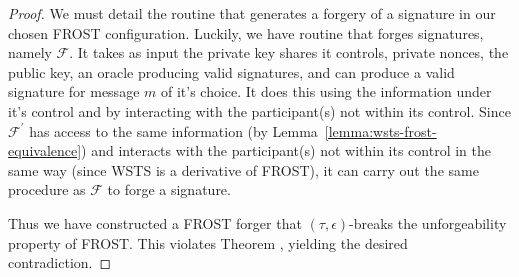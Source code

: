 \documentclass{article}
\theoremstyle{definition}
\theoremstyle{remark}
\begin{document}
\begin{proof}
We must detail the routine that generates a forgery of a signature in our chosen FROST configuration. Luckily, we have routine that forges signatures, namely $\mathcal{F}$. It takes as input the private key shares it controls, private nonces, the public key, an oracle producing valid signatures, and can produce a valid signature for message $m$ of it's choice. It does this using the information under it's control and by interacting with the participant(s) not within its control. Since $\mathcal{F}^\prime$ has access to the same information (by Lemma~\ref{lemma:wsts-frost-equivalence}) and interacts with the participant(s) not within its control in the same way (since WSTS is a derivative of FROST), it can carry out the same procedure as $\mathcal{F}$ to forge a signature.

Thus we have constructed a FROST forger that $(\tau, \epsilon)$-breaks the unforgeability property of FROST. This violates Theorem \cite[\S A.2]{frost}, yielding the desired contradiction.
\end{proof}
\end{document}
